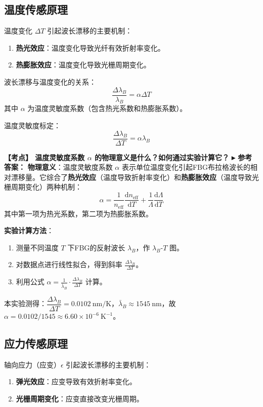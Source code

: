 \documentclass[12pt,a4paper]{article}
\newcommand{\exam}[1]{\textbf{\color{blue!70!black}【考点】#1}}
\newcommand{\answer}[1]{\vspace{2pt}\noindent\textbf{\color{teal!80!black}▸ 参考答案：}#1\vspace{4pt}}
\newcommand{\qa}[2]{\exam{#1}\answer{#2}}
\begin{document}
\subsection{温度传感原理}
温度变化 \(\Delta T\) 引起波长漂移的主要机制：
\begin{enumerate}
    \item \textbf{热光效应}：温度变化导致光纤有效折射率变化。
    \item \textbf{热膨胀效应}：温度变化导致光栅周期变化。
\end{enumerate}

波长漂移与温度变化的关系：
\begin{equation}
    \frac{\Delta \lambda_B}{\lambda_B} = \alpha \Delta T
\end{equation}
其中 \(\alpha\) 为温度灵敏度系数（包含热光系数和热膨胀系数）。

温度灵敏度标定：
\begin{equation}
    \frac{\Delta \lambda_B}{\Delta T} = \alpha \lambda_B
\end{equation}

\qa{
    温度灵敏度系数 $\alpha$ 的物理意义是什么？如何通过实验计算它？
}{
    \textbf{物理意义}：温度灵敏度系数 $\alpha$ 表示单位温度变化引起FBG布拉格波长的相对漂移量。它综合了\textbf{热光效应}（温度导致折射率变化）和\textbf{热膨胀效应}（温度导致光栅周期变化）两种机制：
    \[
    \alpha = \frac{1}{n_{\text{eff}}}\frac{\mathrm{d}n_{\text{eff}}}{\mathrm{d}T} + \frac{1}{\Lambda}\frac{\mathrm{d}\Lambda}{\mathrm{d}T}
    \]
    其中第一项为热光系数，第二项为热膨胀系数。

    \textbf{实验计算方法}：
    \begin{enumerate}
        \item 测量不同温度 $T$ 下FBG的反射波长 $\lambda_B$，作 $\lambda_B$-$T$ 图。
        \item 对数据点进行线性拟合，得到斜率 $\frac{\Delta \lambda_B}{\Delta T}$。
        \item 利用公式 $\alpha = \frac{1}{\bar{\lambda}_B} \cdot \frac{\Delta \lambda_B}{\Delta T}$ 计算。
    \end{enumerate}
    本实验测得：$\dfrac{\Delta \lambda_B}{\Delta T} = 0.0102\ \text{nm/K}$，$\bar{\lambda}_B \approx 1545\ \text{nm}$，故 $\alpha = 0.0102/1545 \approx 6.60\times10^{-6}\ \text{K}^{-1}$。
}

\subsection{应力传感原理}
轴向应力（应变）\(\epsilon\) 引起波长漂移的主要机制：
\begin{enumerate}
    \item \textbf{弹光效应}：应变导致有效折射率变化。
    \item \textbf{光栅周期变化}：应变直接改变光栅周期。
\end{enumerate}
\end{document}
